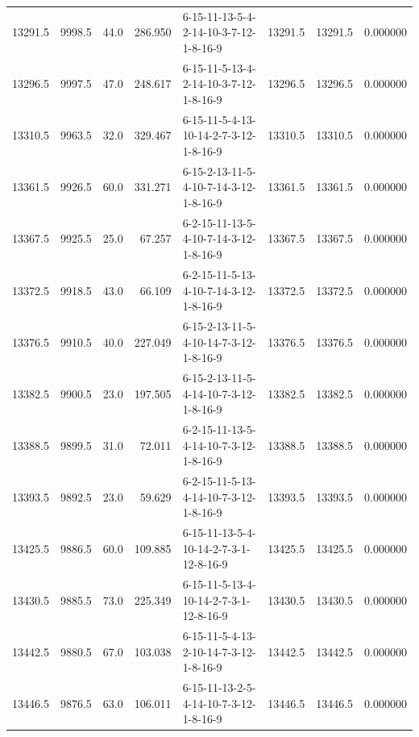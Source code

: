 \begin{tabular}{rrrrlrrr}
 13291.5 &   9998.5 &           44.0 &            286.950 &  6-15-11-13-5-4-2-14-10-3-7-12-1-8-16-9 &       13291.5 &         13291.5 &  0.000000 \\
 13296.5 &   9997.5 &           47.0 &            248.617 &  6-15-11-5-13-4-2-14-10-3-7-12-1-8-16-9 &       13296.5 &         13296.5 &  0.000000 \\
 13310.5 &   9963.5 &           32.0 &            329.467 &  6-15-11-5-4-13-10-14-2-7-3-12-1-8-16-9 &       13310.5 &         13310.5 &  0.000000 \\
 13361.5 &   9926.5 &           60.0 &            331.271 &  6-15-2-13-11-5-4-10-7-14-3-12-1-8-16-9 &       13361.5 &         13361.5 &  0.000000 \\
 13367.5 &   9925.5 &           25.0 &             67.257 &  6-2-15-11-13-5-4-10-7-14-3-12-1-8-16-9 &       13367.5 &         13367.5 &  0.000000 \\
 13372.5 &   9918.5 &           43.0 &             66.109 &  6-2-15-11-5-13-4-10-7-14-3-12-1-8-16-9 &       13372.5 &         13372.5 &  0.000000 \\
 13376.5 &   9910.5 &           40.0 &            227.049 &  6-15-2-13-11-5-4-10-14-7-3-12-1-8-16-9 &       13376.5 &         13376.5 &  0.000000 \\
 13382.5 &   9900.5 &           23.0 &            197.505 &  6-15-2-13-11-5-4-14-10-7-3-12-1-8-16-9 &       13382.5 &         13382.5 &  0.000000 \\
 13388.5 &   9899.5 &           31.0 &             72.011 &  6-2-15-11-13-5-4-14-10-7-3-12-1-8-16-9 &       13388.5 &         13388.5 &  0.000000 \\
 13393.5 &   9892.5 &           23.0 &             59.629 &  6-2-15-11-5-13-4-14-10-7-3-12-1-8-16-9 &       13393.5 &         13393.5 &  0.000000 \\
 13425.5 &   9886.5 &           60.0 &            109.885 &  6-15-11-13-5-4-10-14-2-7-3-1-12-8-16-9 &       13425.5 &         13425.5 &  0.000000 \\
 13430.5 &   9885.5 &           73.0 &            225.349 &  6-15-11-5-13-4-10-14-2-7-3-1-12-8-16-9 &       13430.5 &         13430.5 &  0.000000 \\
 13442.5 &   9880.5 &           67.0 &            103.038 &  6-15-11-5-4-13-2-10-14-7-3-12-1-8-16-9 &       13442.5 &         13442.5 &  0.000000 \\
 13446.5 &   9876.5 &           63.0 &            106.011 &  6-15-11-13-2-5-4-14-10-7-3-12-1-8-16-9 &       13446.5 &         13446.5 &  0.000000 \\

\end{tabular}
